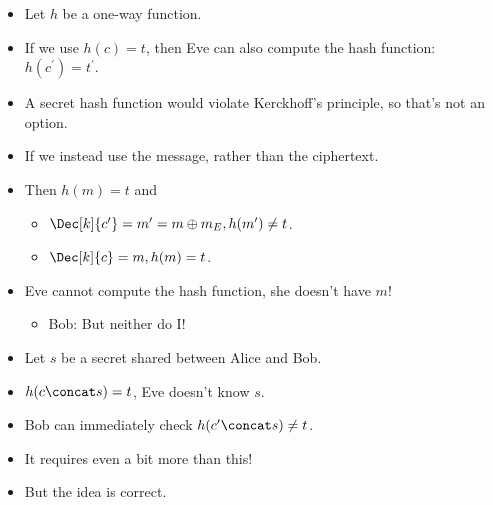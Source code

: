 \begin{frame}
  \begin{example}
    \begin{itemize}
      \item Let \(h\) be a one-way function.
        
        \pause{}
        
      \item If we use \(h(c) = t\), then Eve can also compute the hash 
        function: \(h(c^\prime) = t^\prime\).

        \pause{}

      \item A secret hash function would violate Kerckhoff's principle, so 
        that's not an option.

        \pause{}

      \item If we instead use the message, rather than the ciphertext.
        
      \item Then \(h(m) = t\) and
        \begin{itemize}
          \item \(\Dec[k]{c^\prime} = m^\prime = m\oplus m_E, h(m^\prime)\neq 
              t\).
          \item \(\Dec[k]{c} = m, h(m) = t\).
        \end{itemize}

        \pause{}
        
      \item Eve cannot compute the hash function, she doesn't have \(m\)!
        \pause{}
        \begin{itemize}
          \item Bob: But neither do I\@!
        \end{itemize}
    \end{itemize}
  \end{example}
\end{frame}

\begin{frame}
  \begin{solution}
    \begin{itemize}
      \item Let \(s\) be a secret shared between Alice and Bob.

        \pause{}

      \item \(h(c\concat s) = t\), Eve doesn't know \(s\).
      \item Bob can immediately check \(h(c^\prime\concat s)\neq t\).
    \end{itemize}
  \end{solution}

  \pause{}

  \begin{remark}
    \begin{itemize}
      \item It requires even a bit more than this!
      \item But the idea is correct.
    \end{itemize}
  \end{remark}
\end{frame}

